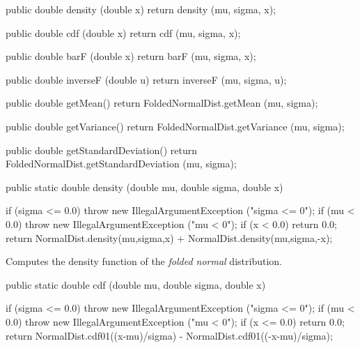 \begin{code}\begin{hide}

   public double density (double x) {
      return density (mu, sigma, x);
   }

   public double cdf (double x) {
      return cdf (mu, sigma, x);
   }

   public double barF (double x) {
      return barF (mu, sigma, x);
   }

   public double inverseF (double u) {
      return inverseF (mu, sigma, u);
   }

   public double getMean() {
      return FoldedNormalDist.getMean (mu, sigma);
   }

   public double getVariance() {
      return FoldedNormalDist.getVariance (mu, sigma);
   }

   public double getStandardDeviation() {
      return FoldedNormalDist.getStandardDeviation (mu, sigma);
   }\end{hide}

   public static double density (double mu, double sigma, double x)\begin{hide} {
      if (sigma <= 0.0)
         throw new IllegalArgumentException ("sigma <= 0");
      if (mu < 0.0)
         throw new IllegalArgumentException ("mu < 0");
      if (x < 0.0) return 0.0;
      return NormalDist.density(mu,sigma,x) + NormalDist.density(mu,sigma,-x);
   }\end{hide}
\end{code}
\begin{tabb} Computes the density function of the {\em folded normal\/} 
distribution.
\end{tabb}
\begin{htmlonly}
\end{htmlonly}
\begin{code}

   public static double cdf (double mu, double sigma, double x)\begin{hide} {
      if (sigma <= 0.0)
         throw new IllegalArgumentException ("sigma <= 0");
      if (mu < 0.0)
         throw new IllegalArgumentException ("mu < 0");
      if (x <= 0.0) return 0.0;
      return NormalDist.cdf01((x-mu)/sigma) - NormalDist.cdf01((-x-mu)/sigma);
   }\end{hide}
\end{code}
